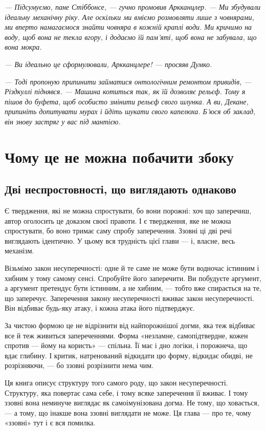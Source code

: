 \documentclass[12pt, a4paper, openany]{book}
\begin{document}
\begin{terrybox}
\textit{--- Підсумуємо, пане Стіббонсе, --- гучно промовив Аркканцлер. --- Ми збудували ідеальну механічну ріку. Але оскільки ми вміємо розмовляти лише з човнярами, ми вперто намагаємося знайти човняра в кожній краплі води. Ми кричимо на воду, щоб вона не текла вгору, і додаємо їй пам'яті, щоб вона не забувала, що вона мокра.}

\textit{--- Ви ідеально це сформулювали, Аркканцлере! --- просяяв Думко.}

\textit{--- Тоді пропоную припинити займатися онтологічним ремонтом привидів, --- Різдкуллі піднявся. --- Машина котиться так, як їй дозволяє рельєф. Тому я пішов до буфета, щоб особисто змінити рельєф свого шлунка. А ви, Декане, припиніть допитувати мурах і йдіть шукати свого капелюха. Б'юся об заклад, він знову застряг у вас під мантією.}
\end{terrybox}


\chapter{Чому це не можна побачити збоку}

\section{Дві неспростовності, що виглядають однаково}

Є твердження, які не можна спростувати, бо вони порожні: хоч що заперечиш, автор оголосить це доказом своєї правоти. І є твердження, яке не можна спростувати, бо воно тримає саму спробу заперечення. Ззовні ці дві речі виглядають ідентично. У цьому вся трудність цієї глави --- і, власне, весь механізм.

Візьмімо закон несуперечності: одне й те саме не може бути водночас істинним і хибним у тому самому сенсі. Спробуйте його заперечити. Ви побудуєте аргумент, а аргумент претендує бути істинним, а не хибним, --- тобто вже спирається на те, що заперечує. Заперечення закону несуперечності вживає закон несуперечності. Він відбиває будь-яку атаку, і кожна атака його підтверджує.

За чистою формою це не відрізнити від найпорожнішої догми, яка теж відбиває все й теж живиться запереченнями. Форма «незламне, самопідтвердне, кожен спротив --- йому на користь» --- спільна. Її має і дно логіки, і порожнеча, що вдає глибину. І критик, натренований відкидати цю форму, відкидає обидві, не розрізняючи, --- бо ззовні розрізнити нема чим.

Ця книга описує структуру того самого роду, що закон несуперечності. Структуру, яка повертає сама себе, і тому всяке заперечення її вживає. І тому ззовні вона неминуче виглядає як самоімунізована догма. Не тому, що ховається, --- а тому, що інакше вона ззовні виглядати не може. Ця глава --- про те, чому «ззовні» тут і є вся помилка.
\end{document}
